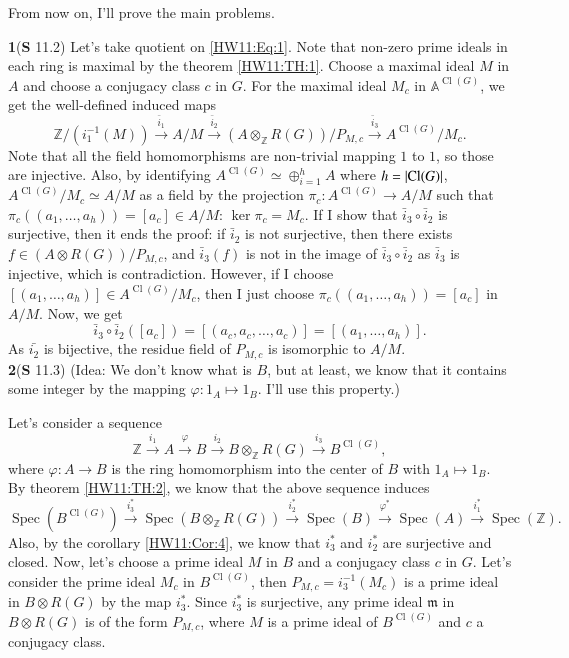 \documentclass[a4paper, 12pt]{article}
\theoremstyle{Mydefinition}
\theoremstyle{Mytheorem}
\DeclareMathOperator{\cl}{Cl}
\DeclareMathOperator{\Spec}{Spec}
\begin{document}
From now on, I'll prove the main problems.

\noindent \textbf{1}(\textbf{S} 11.2)
Let's take quotient on \eqref{HW11:Eq:1}. Note that non-zero prime ideals in each ring is maximal by the theorem \ref{HW11:TH:1}. Choose a maximal ideal $M$ in $A$ and choose a conjugacy class $c$ in $G$. For the maximal ideal $M_c$ in $\mathbb{A}^{\cl(G)}$, we get the well-defined induced maps
\begin{equation}
    \mathbb{Z}/(i^{-1}_1(M))\xrightarrow{\bar{i}_1} A/M\xrightarrow{\bar{i}_2}(A\otimes_{\mathbb{Z}} R(G))/P_{M,c}\xrightarrow{\bar{i}_3}A^{\cl(G)}/M_c.
\end{equation}
Note that all the field homomorphisms are non-trivial mapping $1$ to $1$, so those are injective. Also, by identifying $A^{\cl(G)}\simeq \oplus_{i=1}^h A$ where $h=\abs{\cl(G)}$, $A^{\cl(G)}/M_c\simeq A/M$ as a field by the projection $\pi_c:A^{\cl(G)}\rightarrow A/M$ such that $\pi_c((a_1, \ldots, a_h)) = [a_c]\in A/M$: $\ker\pi_c =M_c$. If I show that $\bar{i}_3\circ \bar{i}_2$ is surjective, then it ends the proof: if $\bar{i}_2$ is not surjective, then there exists $f\in (A\otimes R(G))/P_{M,c}$, and $\bar{i}_3(f)$ is not in the image of $\bar{i}_3\circ \bar{i}_2$ as $\bar{i}_3$ is injective, which is contradiction. However, if I choose $[(a_1, \ldots, a_h)]\in A^{\cl(G)}/M_c$, then I just choose $\pi_c((a_1, \ldots, a_h)) = [a_c]$ in $A/M$. Now, we get 
\begin{equation}
    \bar{i}_3\circ \bar{i}_2([a_c]) = [(a_c, a_c,\ldots ,a_c)] = [(a_1, \ldots, a_h)].
\end{equation}
As $\bar{i_2}$ is bijective, the residue field of $P_{M,c}$ is isomorphic to $A/M$.\\

\noindent \textbf{2}(\textbf{S} 11.3)
(Idea: We don't know what is $B$, but at least, we know that it contains some integer by the mapping $\varphi:1_A\mapsto 1_B$. I'll use this property.)

Let's consider a sequence
\begin{equation}
    \mathbb{Z}\xrightarrow{i_1} A\xrightarrow{\varphi} B\xrightarrow{i_2}B\otimes_{\mathbb{Z}} R(G)\xrightarrow{i_3}B^{\cl(G)},
\end{equation}
where $\varphi:A\rightarrow B$ is the ring homomorphism into the center of $B$ with $1_A\mapsto 1_B$. By theorem \ref{HW11:TH:2}, we know that the above sequence induces
\begin{equation}
    \Spec(B^{\cl(G)})\xrightarrow{i^*_3}\Spec(B\otimes_{\mathbb{Z}} R(G))\xrightarrow{i^*_2}\Spec(B)\xrightarrow{\varphi^*}\Spec(A)\xrightarrow{i_1^*}\Spec(\mathbb{Z}).
\end{equation}
Also, by the corollary \ref{HW11:Cor:4}, we know that $i_3^*$ and $i_2^*$ are surjective and closed. Now, let's choose a prime ideal $M$ in $B$ and a conjugacy class $c$ in $G$. Let's consider the prime ideal $M_c$ in $B^{\cl (G)}$, then $P_{M,c} = i_3^{-1}(M_c)$ is a prime ideal in $B\otimes R(G)$ by the map $i_3^*$. Since $i_3^*$ is surjective, any prime ideal $\mathfrak{m}$ in $B\otimes R(G)$ is of the form $P_{M,c}$, where $M$ is a prime ideal of $B^{\cl(G)}$ and $c$ a conjugacy class.
\end{document}

